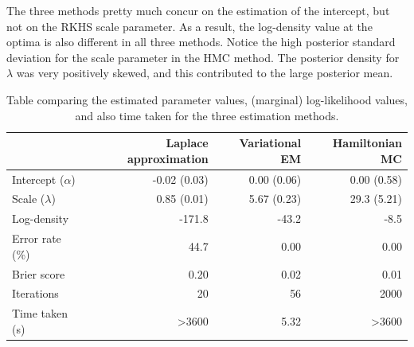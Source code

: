 The three methods pretty much concur on the estimation of the intercept, but not on the RKHS scale parameter.
As a result, the log-density value at the optima is also different in all three methods.
Notice the high posterior standard deviation for the scale parameter in the HMC method.
The posterior density for $\lambda$ was very positively skewed, and this contributed to the large posterior mean.

\begin{table}[hbt]
\centering
\caption{Table comparing the estimated parameter values, (marginal) log-likelihood values, and also time taken for the three estimation methods.}
\label{tab:compreiprobit}
\begin{tabular}{@{}lrrr@{}}
\toprule
& Laplace approximation 
& Variational EM 
& Hamiltonian MC          \\ \midrule
Intercept ($\alpha$)      & -0.02 (0.03)           & 0.00 (0.06)    & 0.00 (0.58)  \\
Scale ($\lambda$)      & 0.85 (0.01)         & 5.67 (0.23)  & 29.3 (5.21)     \\[0.5em]
Log-density    & -171.8              & -43.2       & -8.5                  \\
Error rate (\%) & 44.7               & 0.00        & 0.00                   \\
Brier score & 0.20               & 0.02        & 0.01                   \\[0.5em]
Iterations     & 20                  & 56          & 2000                    \\
Time taken (s) & >3600                & 5.32         & >3600                     \\ \bottomrule
\end{tabular}
\end{table}


